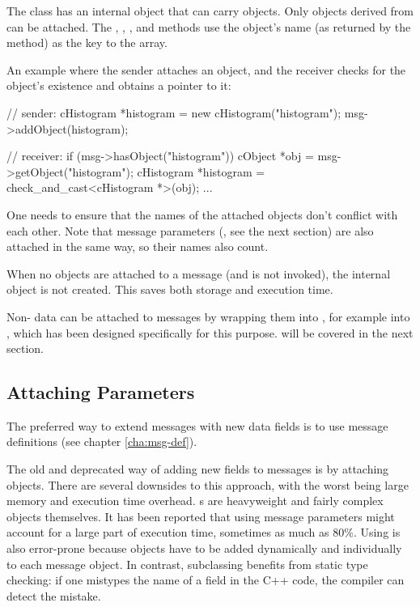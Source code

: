 The  class has an internal  object that
can carry objects. Only objects derived from  can be attached.
The , ,
, and  methods use the object's name
(as returned by the  method) as the key to the array.

An example where the sender attaches an object, and the receiver
checks for the object's existence and obtains a pointer to it:

\begin{cpp}
// sender:
cHistogram *histogram = new cHistogram("histogram");
msg->addObject(histogram);

// receiver:
if (msg->hasObject("histogram")) {
   cObject *obj = msg->getObject("histogram");
   cHistogram *histogram = check_and_cast<cHistogram *>(obj);
   ...
}
\end{cpp}

One needs to ensure that the names of the attached objects don't
conflict with each other. Note that message parameters (,
see the next section) are also attached in the same way, so their names
also count.

When no objects are attached to a message (and  is not
invoked), the internal  object is not created.
This saves both storage and execution time.

Non- data can be attached to messages by wrapping them into
, for example into , which has been designed
specifically for this purpose.  will be covered in the next
section.

\subsection{Attaching Parameters}
\label{sec:messages:attaching-parameters}

The preferred way to extend messages with new data fields is to use
message definitions (see chapter \ref{cha:msg-def}).

The old and deprecated way of adding new fields to messages is by
attaching  objects.
There are several downsides to this approach, with the worst being
large memory and execution time overhead. s are
heavyweight and fairly complex objects themselves.
It has been reported that using  message parameters
might account for a large part of execution time, sometimes as much as 80\%.
Using  is also error-prone because  objects
have to be added dynamically and individually to each message object.
In contrast, subclassing benefits from static type checking:
if one mistypes the name of a field in the C++ code, the compiler
can detect the mistake.

